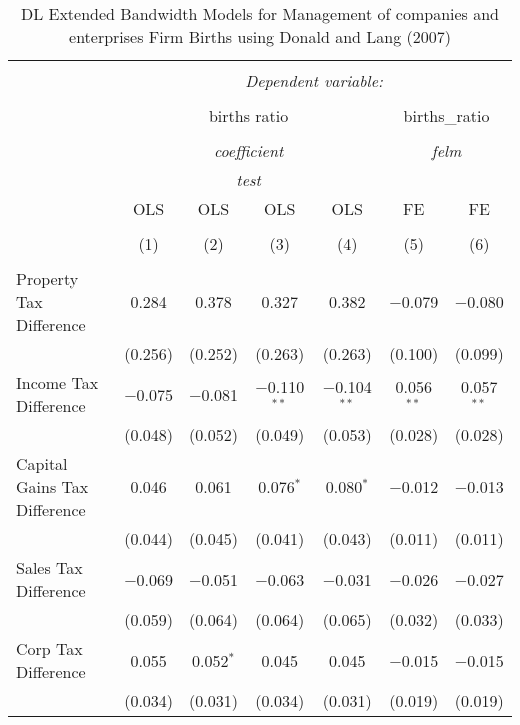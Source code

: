 
\begin{table}[!htbp] \centering 
  \caption{DL Extended Bandwidth Models for  Management of companies and enterprises Firm Births using Donald and Lang (2007)} 
  \label{} 
\begin{tabular}{@{\extracolsep{5pt}}lcccccc} 
\\[-1.8ex]\hline 
\hline \\[-1.8ex] 
 & \multicolumn{6}{c}{\textit{Dependent variable:}} \\ 
\cline{2-7} 
\\[-1.8ex] & \multicolumn{4}{c}{births ratio} & \multicolumn{2}{c}{births\_ratio} \\ 
\\[-1.8ex] & \multicolumn{4}{c}{\textit{coefficient}} & \multicolumn{2}{c}{\textit{felm}} \\ 
 & \multicolumn{4}{c}{\textit{test}} & \multicolumn{2}{c}{\textit{}} \\ 
 & OLS & OLS & OLS & OLS & FE & FE \\ 
\\[-1.8ex] & (1) & (2) & (3) & (4) & (5) & (6)\\ 
\hline \\[-1.8ex] 
 Property Tax Difference & 0.284 & 0.378 & 0.327 & 0.382 & $-$0.079 & $-$0.080 \\ 
  & (0.256) & (0.252) & (0.263) & (0.263) & (0.100) & (0.099) \\ 
  Income Tax Difference & $-$0.075 & $-$0.081 & $-$0.110$^{**}$ & $-$0.104$^{**}$ & 0.056$^{**}$ & 0.057$^{**}$ \\ 
  & (0.048) & (0.052) & (0.049) & (0.053) & (0.028) & (0.028) \\ 
  Capital Gains Tax Difference & 0.046 & 0.061 & 0.076$^{*}$ & 0.080$^{*}$ & $-$0.012 & $-$0.013 \\ 
  & (0.044) & (0.045) & (0.041) & (0.043) & (0.011) & (0.011) \\ 
  Sales Tax Difference & $-$0.069 & $-$0.051 & $-$0.063 & $-$0.031 & $-$0.026 & $-$0.027 \\ 
  & (0.059) & (0.064) & (0.064) & (0.065) & (0.032) & (0.033) \\ 
  Corp Tax Difference & 0.055 & 0.052$^{*}$ & 0.045 & 0.045 & $-$0.015 & $-$0.015 \\ 
  & (0.034) & (0.031) & (0.034) & (0.031) & (0.019) & (0.019) \\ 

\end{tabular}
\end{table}
